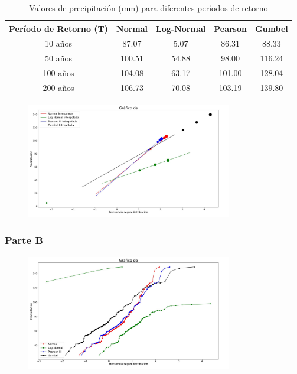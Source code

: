 \documentclass{article}  %
\begin{document}
\begin{table}[H]
  \centering
  \caption{Valores de precipitación (mm) para diferentes períodos de retorno}
  \begin{tabular}{|c|c|c|c|c|}
  \hline
  \textbf{Período de Retorno (T)} & \textbf{Normal} & \textbf{Log-Normal} & \textbf{Pearson} & \textbf{Gumbel} \\ \hline
  10 años  & 87.07 & 5.07 & 86.31 & 88.33 \\ \hline
  50 años  & 100.51 & 54.88 & 98.00 & 116.24 \\ \hline
  100 años & 104.08 & 63.17 & 101.00 & 128.04 \\ \hline
  200 años & 106.73 & 70.08 & 103.19 & 139.80 \\ \hline
  \end{tabular}
\end{table}

\begin{figure}[H]
  \centering
  \includegraphics[width=0.8\textwidth]{grafico_proyecciones.jpg}
  \caption{}
  \label{fig:grafico_preyecciones}
\end{figure}

\newpage
\subsubsection*{Parte B}

\begin{figure}[H]
  \centering
  \includegraphics[width=0.8\textwidth]{grafico_b.jpg}
  \caption{}
  \label{fig:grafico_b}
\end{figure}
\end{document}
